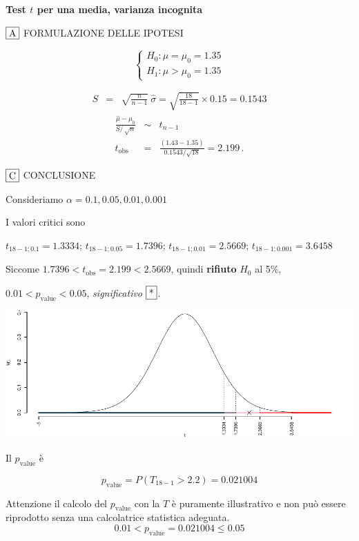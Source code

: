 \documentclass[
  11pt,
]{book}
\theoremstyle{mytheoremstyle}
\theoremstyle{mydefstyle}
\newenvironment{sol}
  {
  \begin{tcolorbox}[enhanced,breakable,arc=0.1mm,boxrule=1pt,colback=white,colframe=iblue,
  title=\bf \fontfamily{lmss}\selectfont \hspace{.5 cm} Soluzione,drop fuzzy shadow]

}{
\end{tcolorbox}
  }
\begin{document}
\begin{sol}
\textbf{Test \(t\) per una media, varianza incognita}

\(\fbox{A}\) FORMULAZIONE DELLE IPOTESI

\[\begin{cases}
   H_0: \mu = \mu_0=1.35 \\
   H_1: \mu > \mu_0=1.35 
   \end{cases}\]

\begin{eqnarray*}
   S    &=& \sqrt{\frac{n} {n-1}}\ \widehat{\sigma} 
   =  \sqrt{\frac{ 18 } { 18 -1}} \times  0.15  =  0.1543 
   \end{eqnarray*}
\begin{eqnarray*}
   \frac{\hat\mu - \mu_{0}} {S/\,\sqrt{n}}&\sim&t_{n-1}\\
   t_{\text{obs}}
   &=& \frac{ ( 1.43 -  1.35 )} { 0.1543 /\sqrt{ 18 }}
   =   2.199 \, .
   \end{eqnarray*}

\(\fbox{C}\) CONCLUSIONE

Consideriamo \(\alpha=0.1, 0.05, 0.01, 0.001\)

I valori critici sono

\(t_{18-1;0.1}=1.3334\); \(t_{18-1;0.05}=1.7396\); \(t_{18-1;0.01}=2.5669\); \(t_{18-1;0.001}=3.6458\)

Siccome \(1.7396<t_\text{obs}=2.199<2.5669\), quindi \textbf{rifiuto} \(H_0\) al 5\%,

\(0.01<p_\text{value}<0.05\), \emph{significativo} \(\fbox{*}\).

\begin{center}\includegraphics{Esami_passati_con_soluzioni_files/figure-latex/1.5b-1} \end{center}

Il \(p_{\text{value}}\) è

\[ p_{\text{value}} = P(T_{18-1}>2.2)=0.021004 \]

Attenzione il calcolo del \(p_\text{value}\) con la \(T\) è puramente illustrativo e non può essere riprodotto senza una calcolatrice statistica adeguata.\[
 0.01 < p_\text{value}= 0.021004 \leq 0.05 
\]

\end{sol}
\end{document}
